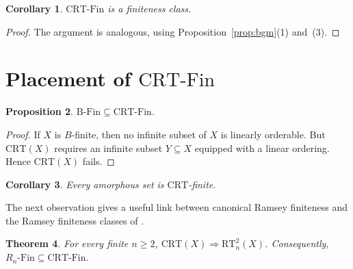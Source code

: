 \documentclass[11pt]{amsart}
\newtheorem{theorem}{Theorem}[section]
\newtheorem{proposition}[theorem]{Proposition}
\newtheorem{corollary}[theorem]{Corollary}
\theoremstyle{definition}
\newcommand{\BFin}{\mathrm{B\text{-}Fin}}
\newcommand{\RnFin}[1]{R_{#1}\text{-}\mathrm{Fin}}
\newcommand{\CRT}{\mathrm{CRT}}
\newcommand{\RT}{\mathrm{RT}}
\newcommand{\CRTFin}{\CRT\text{-}\mathrm{Fin}}
\begin{document}
\begin{corollary}\label{cor:crt-fin-class}
\(\CRTFin\) is a finiteness class.
\end{corollary}

\begin{proof}
The argument is analogous, using Proposition~\ref{prop:bgm}(1) and~(3).
\end{proof}

\section{Placement of \(\CRTFin\)}

\begin{proposition}\label{prop:bfin-crt}
\(\BFin\subseteq \CRTFin\).
\end{proposition}

\begin{proof}
If \(X\) is \(B\)-finite, then no infinite subset of \(X\) is linearly orderable.  But \(\CRT(X)\) requires an infinite subset \(Y\subseteq X\) equipped with a linear ordering.  Hence \(\CRT(X)\) fails.
\end{proof}

\begin{corollary}
Every amorphous set is \(\CRT\)-finite.
\end{corollary}

The next observation gives a useful link between canonical Ramsey finiteness and the Ramsey finiteness classes of \cite{BCF}.

\begin{theorem}\label{thm:crt-implies-rt}
For every finite \(n\geq 2\), \(\CRT(X)\Rightarrow \RT^2_n(X)\).  Consequently, \(\RnFin{n}\subseteq \CRTFin\).
\end{theorem}
\end{document}
